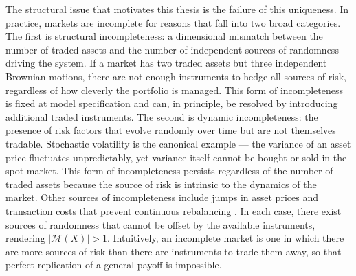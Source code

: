 The structural issue that motivates this thesis is the failure of this
uniqueness.  In practice, markets are incomplete for reasons that fall
into two broad categories.  The first is structural incompleteness: a
dimensional mismatch between the number of traded assets and the number of
independent sources of randomness driving the system.  If a market has two
traded assets but three independent Brownian motions, there are not enough
instruments to hedge all sources of risk, regardless of how cleverly the
portfolio is managed.  This form of incompleteness is fixed at model
specification and can, in principle, be resolved by introducing additional
traded instruments.  The second is dynamic incompleteness: the presence of
risk factors that evolve randomly over time but are not themselves
tradable.  Stochastic volatility \citep{Heston1993} is the canonical
example --- the variance of an asset price fluctuates unpredictably, yet
variance itself cannot be bought or sold in the spot market.  This form of
incompleteness persists regardless of the number of traded assets because
the source of risk is intrinsic to the dynamics of the market.  Other
sources of incompleteness include jumps in asset prices
\citep{Merton1976} and transaction costs that prevent continuous
rebalancing \citep{LelandReplication1985}.  In each case, there exist
sources of randomness that cannot be offset by the available instruments,
rendering $|\mathcal{M}(X)| > 1$.  Intuitively, an incomplete market is
one in which there are more sources of risk than there are instruments to
trade them away, so that perfect replication of a general payoff is
impossible.

